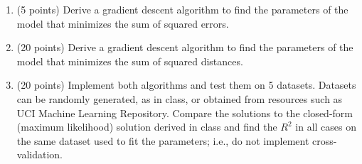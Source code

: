 \documentclass[twoside]{article}
\begin{document}
\begin{enumerate}
\item (5 points) Derive a gradient descent algorithm to find the parameters of the model that minimizes the sum of squared errors. 

\item (20 points) Derive a gradient descent algorithm to find the parameters of the model that minimizes the sum of squared distances. 

\item (20 points) Implement both algorithms and test them on 5 datasets. Datasets can be randomly generated, as in class, or obtained from resources such as UCI Machine Learning Repository. Compare the solutions to the closed-form (maximum likelihood) solution derived in class and find the $R^2$ in all cases on the same dataset used to fit the parameters; i.e., do not implement cross-validation.
\end{enumerate}
\end{document}
